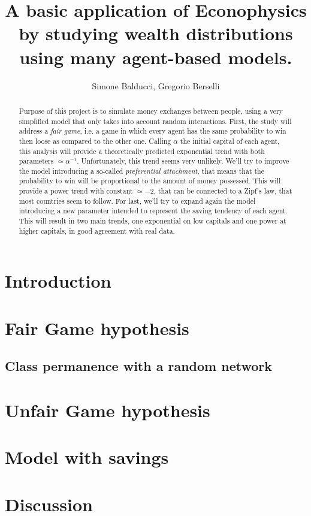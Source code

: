 \documentclass[12pt,a4paper]{article}
\title{A basic application of Econophysics by studying wealth distributions using many agent-based models.}
\author{Simone Balducci, Gregorio Berselli}
\date{}
\begin{document}
\maketitle

\begin{abstract}
    Purpose of this project is to simulate money exchanges between people, using a very simplified model that only takes into account random interactions.
    First, the study will address a \emph{fair game}, i.e. a game in which every agent has the same probability to win then loose as compared to the other one.
    Calling $\alpha$ the initial capital of each agent, this analysis will provide a theoretically predicted exponential trend with both parameters $\simeq \alpha^{-1}$.
    Unfortunately, this trend seems very unlikely.
    We'll try to improve the model introducing a so-called \emph{preferential attachment}, that means that the probability to win will be proportional to the amount of money possessed.
    This will provide a power trend with constant $\simeq -2$, that can be connected to a Zipf's law, that most countries seem to follow.
    For last, we'll try to expand again the model introducing a new parameter intended to represent the saving tendency of each agent.
    This will result in two main trends, one exponential on low capitals and one power at higher capitals, in good agreement with real data. 
\end{abstract}

\newpage
\thispagestyle{empty}
\addtocounter{page}{-2}
\mbox{}

\tableofcontents
\pagebreak

\section*{Introduction}

\pagebreak

\section{Fair Game hypothesis}


\subsection{Class permanence with a random network}

\pagebreak

\section{Unfair Game hypothesis}

\pagebreak

\section{Model with savings}

\pagebreak

\section{Discussion}


\newpage
\thispagestyle{empty}
\mbox{}

\printbibliography
\end{document}
